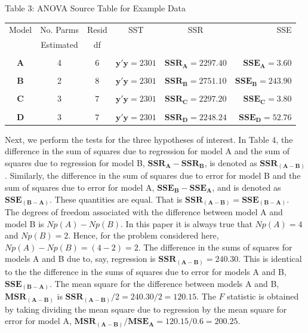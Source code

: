 \documentclass[11pt, oneside]{article}   	%
\begin{document}
\begin{table} [h]
\centerline{Table 3: ANOVA Source Table for Example Data} 
\centering
\bigskip
\begin{tabular}{cccccr}
Model & No. Parms & Resid & SST & SSR & SSE \\ 
          & Estimated &   df   &   &    & \\
\hline
    &    &     &    &    &  \\
\textbf{A}  &  4  &  $ 6 $  &  $  \mathbf{y} ' \mathbf{y} = 2301 $  & $ \mathbf{SSR_{A}} = 2297.40 $ &   $ \mathbf{SSE_{A}} =  3.60    $        \\
 &  &  &  &  &  \\
\textbf{B}  &  2  &  $ 8 $  &  $  \mathbf{y} ' \mathbf{y} = 2301 $  & $ \mathbf{SSR_{B}} = 2751.10 $ &   $  \mathbf{SSE_{B}} =  243.90   $        \\
&  &  &  &  &  \\
\textbf{C}  &  3  &  $ 7 $  &  $  \mathbf{y} ' \mathbf{y} = 2301 $  & $ \mathbf{SSR_{C}} = 2297.20 $ &   $  \mathbf{SSE_{C}} = 3.80    $        \\
&  &  &  &  &  \\
\textbf{D}  &  3  &  $ 7 $  &  $  \mathbf{y} ' \mathbf{y} = 2301 $  & $ \mathbf{SSR_{D}} = 2248.24 $ &   $  \mathbf{SSE_{D}} = 52.76    $        \\
\end{tabular} 
\end{table}

Next, we perform the tests for the three hypotheses of interest.  In Table 4, the difference in the sum of squares due to regression for model A and the sum of squares due to regression for model B, $  \mathbf{SSR_{A}} -  \mathbf{SSR_{B}} $, is denoted as $  \mathbf{SSR_{(A-B)}}  $.  Similarly, the difference in the sum of squares due to error for model B and the sum of squares due to error for model A, $  \mathbf{SSE_{B}} -  \mathbf{SSE_{A}}   $, and is denoted as $ \mathbf{ SSE_{(B-A)}}   $. These quantities are equal.  That is $   \mathbf{SSR_{(A-B)}}  =  \mathbf{ SSE_{(B-A)}}   $.  The degrees of freedom associated with the difference between model A and model B is $  Np(A) - Np(B)  $.  In this paper it is always true that $  Np(A) = 4 $ and $  Np(B) = 2  $.  Hence, for the problem considered here,  $  Np(A) - Np(B)   =  (4 - 2) =  2$.  The difference in the sums of squares for models A and B due to, say, regression is $ \mathbf{SSR_{(A-B)}}  = 240.30 $.  This is identical to the the difference in the sums of squares due to error for models A and B, $  \mathbf{SSE_{(B-A)}} $. The mean square for the difference between models A and B, $ \mathbf{MSR_{(A-B)}}  $ is $ \mathbf{SSR_{(A-B)}} / 2 = 240.30/2 = 120.15 $.  The $ F  $ statistic is obtained by taking dividing the mean square due to regression by the mean square for error for model A, $ \mathbf{MSR_{(A-B)}} / \mathbf{MSE_{A}} = 120.15/ 0.6 = 200.25 $.  
\end{document}

